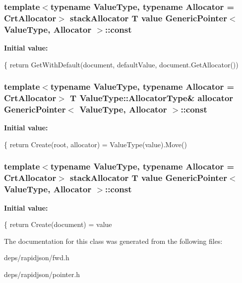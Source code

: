 \subsubsection[{\texorpdfstring{const}{const}}]{\setlength{\rightskip}{0pt plus 5cm}template$<$typename Value\+Type, typename Allocator = Crt\+Allocator$>$ stack\+Allocator T value {\bf Generic\+Pointer}$<$ Value\+Type, Allocator $>$\+::const}\hypertarget{class_generic_pointer_abb1b141cfe93b7159842b5cad60d1be3}{}\label{class_generic_pointer_abb1b141cfe93b7159842b5cad60d1be3}
{\bfseries Initial value\+:}
\begin{DoxyCode}
\{
        \textcolor{keywordflow}{return} GetWithDefault(document, defaultValue, document.GetAllocator())
\end{DoxyCode}
\subsubsection[{\texorpdfstring{const}{const}}]{\setlength{\rightskip}{0pt plus 5cm}template$<$typename Value\+Type, typename Allocator = Crt\+Allocator$>$ T Value\+Type\+::\+Allocator\+Type\& allocator {\bf Generic\+Pointer}$<$ Value\+Type, Allocator $>$\+::const}\hypertarget{class_generic_pointer_ace82428d4ad958b05a52480d949b32fa}{}\label{class_generic_pointer_ace82428d4ad958b05a52480d949b32fa}
{\bfseries Initial value\+:}
\begin{DoxyCode}
\{
        \textcolor{keywordflow}{return} Create(root, allocator) = ValueType(value).Move()
\end{DoxyCode}
\subsubsection[{\texorpdfstring{const}{const}}]{\setlength{\rightskip}{0pt plus 5cm}template$<$typename Value\+Type, typename Allocator = Crt\+Allocator$>$ stack\+Allocator T value {\bf Generic\+Pointer}$<$ Value\+Type, Allocator $>$\+::const}\hypertarget{class_generic_pointer_abb1b141cfe93b7159842b5cad60d1be3}{}\label{class_generic_pointer_abb1b141cfe93b7159842b5cad60d1be3}
{\bfseries Initial value\+:}
\begin{DoxyCode}
\{
            \textcolor{keywordflow}{return} Create(document) = value
\end{DoxyCode}


The documentation for this class was generated from the following files\+:\begin{DoxyCompactItemize}
\item 
deps/rapidjson/fwd.\+h\item 
deps/rapidjson/pointer.\+h\end{DoxyCompactItemize}
